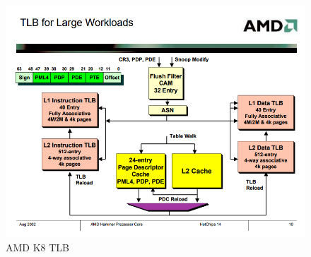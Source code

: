\documentclass[letterpaper,10pt,compsoc,draftclsnofoot,onecolumn]{IEEEtran}
\begin{document}
\begin{figure}[!bhpt]
\captionsetup{justification=centering, aboveskip=2em, belowskip=0em}
\begin{minipage}{1.0\textwidth}
\centering\includegraphics[scale=0.5]{figures/AMD_TLB}
\caption{AMD K8 TLB\cite{amd_ref}}
\label{fig:TLB}
\end{minipage}
\end{figure}
\clearpage


\end{document}

